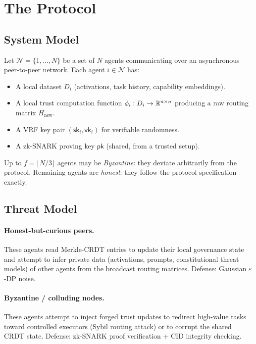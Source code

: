 \section{The \fedsink{} Protocol}
\label{sec:protocol}

\subsection{System Model}

Let $\mathcal{N} = \{1, \ldots, N\}$ be a set of $N$ agents communicating over an
asynchronous peer-to-peer network.  Each agent $i \in \mathcal{N}$ has:
\begin{itemize}
  \item A local dataset $D_i$ (activations, task history, capability embeddings).
  \item A local trust computation function $\phi_i : D_i \to \mathbb{R}^{n \times n}$ producing
    a raw routing matrix $H_{\mathrm{new}}$.
  \item A VRF key pair $(\mathsf{sk}_i, \mathsf{vk}_i)$ for verifiable randomness.
  \item A zk-SNARK proving key $\mathsf{pk}$ (shared, from a trusted setup).
\end{itemize}

Up to $f = \lfloor N/3 \rfloor$ agents may be \emph{Byzantine}: they deviate
arbitrarily from the protocol.  Remaining agents are \emph{honest}: they follow the
protocol specification exactly.

\subsection{Threat Model}

\paragraph{Honest-but-curious peers.}
These agents read Merkle-CRDT entries to update their local governance state and attempt
to infer private data (activations, prompts, constitutional threat models) of other agents
from the broadcast routing matrices.  Defense: Gaussian $\varepsilon$-DP noise.

\paragraph{Byzantine / colluding nodes.}
These agents attempt to inject forged trust updates to redirect high-value tasks toward
controlled executors (Sybil routing attack) or to corrupt the shared CRDT state.
Defense: zk-SNARK proof verification + CID integrity checking.

